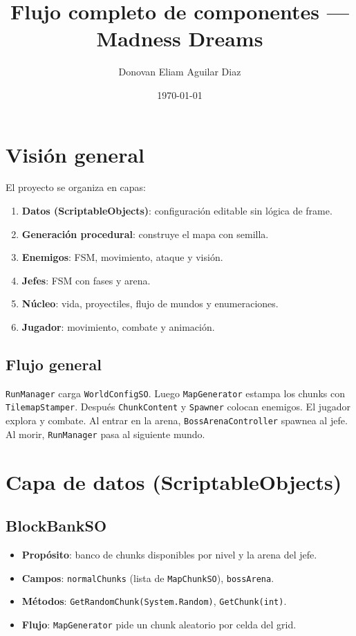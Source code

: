 \documentclass[a4paper,12pt]{article}
\title{Flujo completo de componentes --- Madness Dreams}
\author{Donovan Eliam Aguilar Diaz}
\date{\today}
\begin{document}
\maketitle
\tableofcontents
\newpage

\section{Visión general}

El proyecto se organiza en capas:

\begin{enumerate}
    \item \textbf{Datos (ScriptableObjects)}: configuración editable sin lógica de frame.
    \item \textbf{Generación procedural}: construye el mapa con semilla.
    \item \textbf{Enemigos}: FSM, movimiento, ataque y visión.
    \item \textbf{Jefes}: FSM con fases y arena.
    \item \textbf{Núcleo}: vida, proyectiles, flujo de mundos y enumeraciones.
    \item \textbf{Jugador}: movimiento, combate y animación.
\end{enumerate}

\subsection{Flujo general}

\texttt{RunManager} carga \texttt{WorldConfigSO}. Luego \texttt{MapGenerator} estampa los chunks con \texttt{TilemapStamper}. Después \texttt{ChunkContent} y \texttt{Spawner} colocan enemigos. El jugador explora y combate. Al entrar en la arena, \texttt{BossArenaController} spawnea al jefe. Al morir, \texttt{RunManager} pasa al siguiente mundo.

\section{Capa de datos (ScriptableObjects)}

\subsection{BlockBankSO}

\begin{itemize}
    \item \textbf{Propósito}: banco de chunks disponibles por nivel y la arena del jefe.
    \item \textbf{Campos}: \texttt{normalChunks} (lista de \texttt{MapChunkSO}), \texttt{bossArena}.
    \item \textbf{Métodos}: \texttt{GetRandomChunk(System.Random)}, \texttt{GetChunk(int)}.
    \item \textbf{Flujo}: \texttt{MapGenerator} pide un chunk aleatorio por celda del grid.
\end{itemize}
\end{document}
